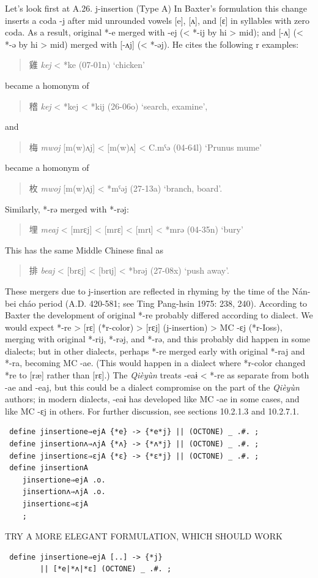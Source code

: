 \documentclass[xetex, svgnames, 12pt]{scrartcl}
\newcounter{para}
\begin{document}
Let's look first at A.26. j-insertion (Type A)
In Baxter's formulation this change inserts a coda -j after mid unrounded vowels [e], [ʌ], and [ɛ] in
 syllables with zero coda. As a result, original *-e merged with -ej (< *-ij 
 by hi > mid); and [-ʌ] (< *-ə by hi > mid) merged with [-ʌj] (< *-əj). He cites the following r
 examples:
 \begin{quote}
 雞 %
 \textit{kej} < *ke (07-01n) `chicken'
 \end{quote}
 became a homonym of
  \begin{quote}
 稽 %
 \textit{kej} < *kej < *kij (26-06o) `search, examine',
 \end{quote}
 and
\begin{quote}
 梅 %
 \textit{mwoj} [m(w)ʌj] < [m(w)ʌ] < C.mˤə (04-64l) `Prunus mume'
\end{quote}
 became a homonym of
 \begin{quote}
 枚 %
 \textit{mwoj} [m(w)ʌj] < *mˤəj (27-13a) `branch, board'.
 \end{quote}
 Similarly, *-rə merged with *-rəj:
 \begin{quote}
 埋 %
 \textit{meaj} < [mrɛj] < [mrɛ] < [mrι] < *mrə (04-35n) `bury'
 \end{quote}
 This has the same Middle Chinese final as
\begin{quote}
 排 %
 \textit{beaj} < [brɛj] < [brιj] < *brəj (27-08x) `push away'.
\end{quote}
 These mergers due to j-insertion are reflected in rhyming by the time of the Nán-bei cháo
 period (A.D. 420-581; see Ting Pang-hsin 1975: 238, 240).
 According to Baxter the development of original *-re probably differed according to dialect. We would
 expect *-re > [rɛ] (*r-color) > [rɛj] (j-insertion) > MC -ɛj (*r-Ioss), merging with original
 *-rij, *-rəj, and *-rə, and this probably did happen in some dialects; but in other dialects,
 perhaps *-re merged early with original *-raj and *-ra, becoming MC -ae. (This would
 happen in a dialect where *r-color changed *re to [ræ] rather than [rɛ].) The \textit{Qièyùn} treats
 -eaɨ < *-re as separate from both -ae and -eaj, but this could be a dialect compromise on the
 part of the \textit{Qièyùn} authors; in modern dialects, -eaɨ has developed like MC -ae in some cases,
 and like MC -ɛj in others. For further discussion, see sections 10.2.1.3 and 10.2.7.1.
 \begin{verbatim}
 define jinsertione⇒ejA {*e} -> {*e*j} || (OCTONE) _ .#. ; 
 define jinsertionʌ⇒ʌjA {*ʌ} -> {*ʌ*j} || (OCTONE) _ .#. ; 
 define jinsertionɛ⇒ɛjA {*ɛ} -> {*ɛ*j} || (OCTONE) _ .#. ; 
 define jinsertionA
    jinsertione⇒ejA .o.
    jinsertionʌ⇒ʌjA .o.
    jinsertionɛ⇒ɛjA
    ;
 \end{verbatim}
TRY A MORE ELEGANT FORMULATION, WHICH SHOULD WORK
\begin{verbatim}
 define jinsertione⇒ejA [..] -> {*j} 
        || [*e|*ʌ|*ɛ] (OCTONE) _ .#. ; 
\end{verbatim}
\end{document}
